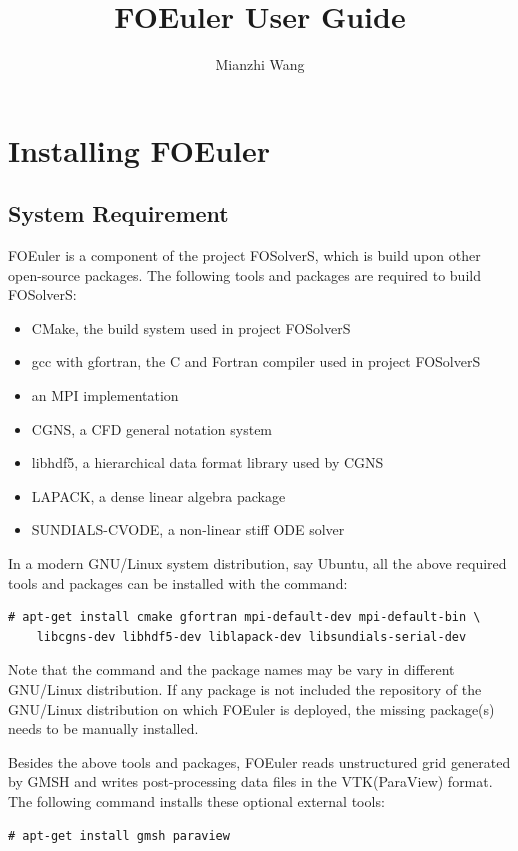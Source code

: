 \documentclass[]{article}
\title{FOEuler User Guide}
\author{Mianzhi Wang}
\begin{document}
\maketitle

\tableofcontents

\section{Installing FOEuler}

\subsection{System Requirement}
\label{sec:requirement}

FOEuler is a component of the project FOSolverS, which is build upon other open-source packages.
The following tools and packages are required to build FOSolverS:
\begin{itemize}
  \item CMake, the build system used in project FOSolverS
  \item gcc with gfortran, the C and Fortran compiler used in project FOSolverS
  \item an MPI implementation
  \item CGNS, a CFD general notation system
  \item libhdf5, a hierarchical data format library used by CGNS
  \item LAPACK, a dense linear algebra package
  \item SUNDIALS-CVODE, a non-linear stiff ODE solver 
\end{itemize}
In a modern GNU/Linux system distribution, say Ubuntu, all the above required tools and packages can
be installed with the command:
\begin{lstlisting}[backgroundcolor=\color{lightgray}]
  # apt-get install cmake gfortran mpi-default-dev mpi-default-bin \
    libcgns-dev libhdf5-dev liblapack-dev libsundials-serial-dev
\end{lstlisting}
Note that the command and the package names may be vary in different GNU/Linux distribution.
If any package is not included the repository of the GNU/Linux distribution on which FOEuler is
deployed, the missing package(s) needs to be manually installed.

Besides the above tools and packages, FOEuler reads unstructured grid generated by GMSH and writes
post-processing data files in the VTK(ParaView) format.
The following command installs these optional external tools:
\begin{lstlisting}[backgroundcolor=\color{lightgray}]
  # apt-get install gmsh paraview
\end{lstlisting}
\end{document}
